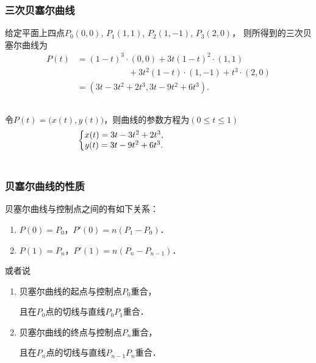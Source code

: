 \documentclass[14pt,notheorems,leqno,xcolor={rgb}]{beamer} %
\begin{document}
\begin{frame}
\frametitle{三次贝塞尔曲线}
\vspace{-0.5em}%
\begin{example}
给定平面上四点$P_0(0,0)$, $P_1(1,1)$, $P_2(1,-1)$, $P_3(2,0)$，
则所得到的三次贝塞尔曲线为
\begin{align*}
P(t) &= (1-t)^3\cdot(0,0) + 3t(1-t)^2\cdot(1,1) \\[-0.3em]
&\qquad\qquad\qquad + 3t^2(1-t)\cdot(1,-1) + t^3\cdot(2,0) \\[-0.3em]
&= (3t-3t^2+2t^3,3t-9t^2+6t^3).
\end{align*}\vspace{-1em}\pause
\begin{columns}[onlytextwidth]
令$P(t)=\big(x(t),y(t)\big)$，则曲线的参数方程为$(0\le t \le 1)$
\[ \left\{ \begin{array}{@{}l@{}}
  x(t)=3t-3t^2+2t^3, \\ y(t)=3t-9t^2+6t^3.
\end{array}\right.\]
\hfill
{}
\end{columns}
\end{example}
\end{frame}

\begin{frame}
\frametitle{贝塞尔曲线的性质}
\begin{property*}
贝塞尔曲线与控制点之间的有如下关系：
\begin{enumerate}
  \item $P(0)=P_0$，$P'(0)=n(P_1-P_0)$．
  \item $P(1)=P_n$，$P'(1)=n(P_n-P_{n-1})$．
\end{enumerate}
\pause 或者说
\begin{enumerate}
  \item 贝塞尔曲线的起点与控制点$P_0$重合，\par
        且在$P_0$点的切线与直线$P_0P_1$重合．
  \item 贝塞尔曲线的终点与控制点$P_n$重合，\par
        且在$P_n$点的切线与直线$P_{n-1}P_n$重合．
\end{enumerate}
\end{property*}
\end{frame}
\end{document}
